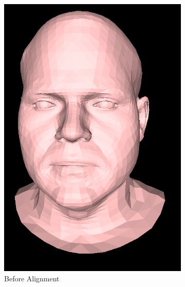 \begin{figure}[h]
    \centering
    \begin{subfigure}[b]{0.4\textwidth}
        \includegraphics[width=\textwidth]{figures/dataset/subject2_unaligned.png}
        \caption{Before Alignment}
    \end{subfigure}
    \begin{subfigure}[b]{0.4\textwidth}

\end{subfigure}
\end{figure}
